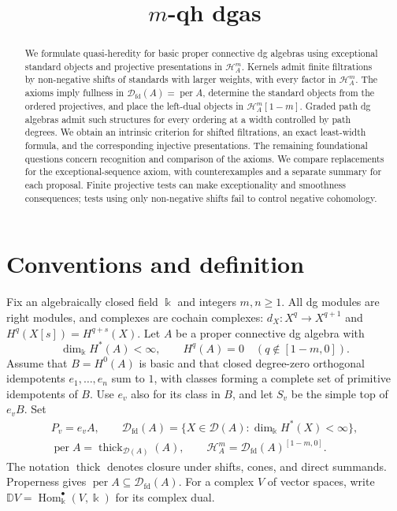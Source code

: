 \documentclass[11pt,a4paper]{article}
\title{$m$-qh dgas}
\author{}
\date{}
\newcommand{\D}{\mathcal D}
\renewcommand{\H}{\mathcal H}
\newcommand{\dual}{\mathbb D}
\DeclareMathOperator{\fd}{fd}
\DeclareMathOperator{\Hom}{Hom}
\DeclareMathOperator{\thick}{thick}
\DeclareMathOperator{\per}{per}
\theoremstyle{plain}
\theoremstyle{definition}
\numberwithin{equation}{section}
\begin{document}
\maketitle
\begin{abstract}
We formulate quasi-heredity for basic proper connective dg algebras
using exceptional standard objects and projective presentations in
$\H_A^m$. Kernels admit finite filtrations by non-negative shifts of
standards with larger weights, with every factor in $\H_A^m$.
The axioms imply fullness in $\D_{\fd}(A)=\per A$, determine the
standard objects from the ordered projectives, and place the left-dual
objects in $\H_A^m[1-m]$. Graded path dg algebras admit such structures
for every ordering at a width controlled by path degrees. We obtain
an intrinsic criterion for shifted filtrations, an exact least-width
formula, and the corresponding injective presentations. The remaining
foundational questions concern recognition and comparison of the axioms.
We compare replacements for the exceptional-sequence axiom, with
counterexamples and a separate summary for each proposal. Finite
projective tests can make exceptionality and smoothness consequences;
tests using only non-negative shifts fail to control negative cohomology.
\end{abstract}

\section{Conventions and definition}\label{sec:definition}

Fix an algebraically closed field $\Bbbk$ and integers $m,n\geq1$.
All dg modules are right modules, and complexes are cochain complexes:
$d_X:X^q\to X^{q+1}$ and $H^q(X[s])=H^{q+s}(X)$.
Let $A$ be a proper connective dg algebra with
\begin{equation}\label{eq:standing}
 \dim_{\Bbbk}H^*(A)<\infty,\qquad
 H^q(A)=0\quad(q\notin[1-m,0]).
\end{equation}
Assume that $B=H^0(A)$ is basic and that closed degree-zero orthogonal
idempotents $e_1,\ldots,e_n$ sum to $1$, with classes forming a complete
set of primitive idempotents of $B$. Use $e_v$ also for its class in $B$,
and let $S_v$ be the simple top of $e_vB$. Set
\begin{equation}\label{eq:categories}
 \begin{gathered}
 P_v=e_vA,\qquad
 \D_{\fd}(A)=\{X\in\D(A):\dim_{\Bbbk}H^*(X)<\infty\},\\
 \per A=\thick_{\D(A)}(A),\qquad
 \H_A^m=\D_{\fd}(A)^{[1-m,0]}.
 \end{gathered}
\end{equation}
The notation $\thick$ denotes closure under shifts, cones, and direct
summands. Properness gives $\per A\subseteq\D_{\fd}(A)$.
For a complex $V$ of vector spaces, write
$\dual V=\Hom^\bullet_{\Bbbk}(V,\Bbbk)$ for its complex dual.
\end{document}
